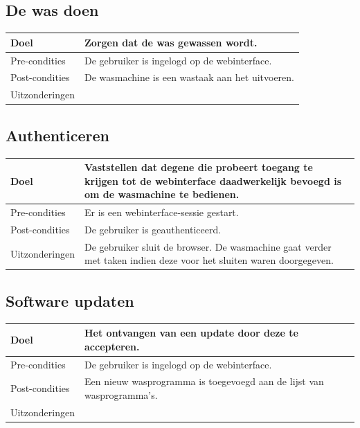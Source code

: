 \subsection{De was doen}
\begin{center}
  \begin{tabular}{ | p{4cm} | p{8.5cm} | }    \hline
    Doel & Zorgen dat de was gewassen wordt. \\ \hline
    Pre-condities & De gebruiker is ingelogd op de webinterface. \\ \hline
    Post-condities & De wasmachine is een wastaak aan het uitvoeren. \\ \hline
    Uitzonderingen & \\
    \hline
  \end{tabular}
\end{center}

\subsection{Authenticeren}
\begin{center}
  \begin{tabular}{ | p{4cm} | p{8.5cm} | } \hline
  Doel & Vaststellen dat degene die probeert toegang te krijgen tot de webinterface daadwerkelijk bevoegd is om de wasmachine te bedienen. \\ \hline
  Pre-condities & Er is een webinterface-sessie gestart.\\ \hline
  Post-condities & De gebruiker is geauthenticeerd. \\ \hline
  Uitzonderingen & De gebruiker sluit de browser. De wasmachine gaat verder met taken indien deze voor het sluiten waren doorgegeven. \\
  \end{tabular}
\end{center}

\subsection{Software updaten}
\begin{center}
  \begin{tabular}{ | p{4cm} | p{8.5cm} | }    \hline
    Doel & Het ontvangen van een update door deze te accepteren. \\ \hline
    Pre-condities & De gebruiker is ingelogd op de webinterface. \\ \hline
    Post-condities & Een nieuw wasprogramma is toegevoegd aan de lijst van wasprogramma's. \\ \hline
    Uitzonderingen &  \\
    \hline
  \end{tabular}
\end{center}

